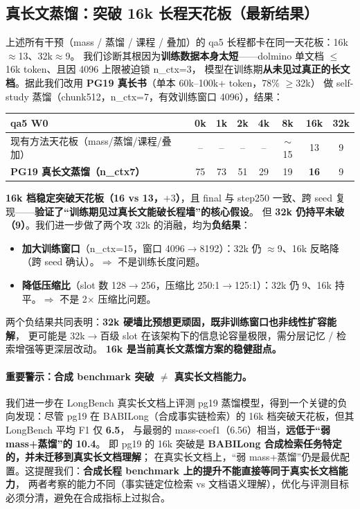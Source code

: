 \documentclass[11pt,a4paper]{ctexart}
\begin{document}
\subsection{真长文蒸馏：突破 16k 长程天花板（最新结果）}
上述所有干预（mass / 蒸馏 / 课程 / 叠加）的 qa5 长程都卡在同一天花板：16k$\approx$13、32k$\approx$9。
我们诊断其根因为\textbf{训练数据本身太短}——dolmino 单文档 $\le$16k token、且因 4096 上限被迫锁 n\_ctx=3，
模型在训练期\textbf{从未见过真正的长文档}。据此我们改用 \textbf{PG19 真长书}（单本 60k--100k+ token，78\% $\ge$32k）
做 self-study 蒸馏（chunk512，n\_ctx=7，有效训练窗口 4096），结果：
\begin{center}\small
\begin{tabular}{lccccccc}
\toprule
\textbf{qa5 W0} & \textbf{0k} & \textbf{1k} & \textbf{2k} & \textbf{4k} & \textbf{8k} & \textbf{16k} & \textbf{32k}\\
\midrule
现有方法天花板（mass/蒸馏/课程/叠加） & -- & -- & -- & -- & $\sim$15 & 13 & 9\\
\textbf{PG19 真长文蒸馏（n\_ctx7）} & 75 & 73 & 51 & 29 & 19 & \textbf{16} & 9\\
\bottomrule
\end{tabular}
\end{center}
\noindent
\textbf{16k 档稳定突破天花板（16 vs 13，$+3$）}，且 final 与 step250 一致、跨 seed 复现——\textbf{验证了“训练期见过真长文能破长程墙”的核心假设}。
但 \textbf{32k 仍持平未破（9）}。我们进一步做了两个攻 32k 的消融，均为\textbf{负结果}：
\begin{itemize}
  \item \textbf{加大训练窗口}（n\_ctx=15，窗口 4096$\to$8192）：32k 仍 $\approx$9、16k 反略降（跨 seed 确认）。$\Rightarrow$ 不是训练长度问题。
  \item \textbf{降低压缩比}（slot 数 128$\to$256，压缩比 250:1$\to$125:1）：32k 仍 9、16k 持平。$\Rightarrow$ 不是 2$\times$ 压缩比问题。
\end{itemize}
两个负结果共同表明：\textbf{32k 硬墙比预想更顽固，既非训练窗口也非线性扩容能解}，
更可能是 32k$\to$百级 slot 在该架构下的信息论容量极限，需分层记忆 / 检索增强等更深层改动。
\textbf{16k 是当前真长文蒸馏方案的稳健甜点。}

\paragraph{重要警示：合成 benchmark 突破 $\ne$ 真实长文档能力。}
我们进一步在 LongBench 真实长文档上评测 pg19 蒸馏模型，得到一个关键的负向发现：尽管 pg19 在
BABILong（合成事实链检索）的 16k 档突破天花板，但其 LongBench 平均 F1 仅 \textbf{6.5}，
与最弱的 mass-coef1（6.56）相当，\textbf{远低于“弱 mass+蒸馏”的 10.4}。
即 pg19 的 16k 突破是\textbf{ BABILong 合成检索任务特定的，并未迁移到真实长文档理解}；
在真实长文档上，“弱 mass+蒸馏”仍是最优配置。这提醒我们：\textbf{合成长程 benchmark 上的提升不能直接等同于真实长文档能力}，
两者考察的能力不同（事实链定位检索 vs 文档语义理解），优化与评测目标必须分清，避免在合成指标上过拟合。
\end{document}
